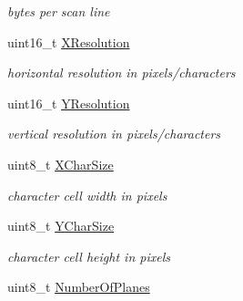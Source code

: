 \begin{DoxyCompactItemize}
\begin{DoxyCompactList}\small\item\em bytes per scan line \end{DoxyCompactList}\item 
uint16\+\_\+t \hyperlink{struct____attribute_____abe48e2b29aa99e813a1447d22711f4f4}{X\+Resolution}\hypertarget{struct____attribute_____abe48e2b29aa99e813a1447d22711f4f4}{}\label{struct____attribute_____abe48e2b29aa99e813a1447d22711f4f4}

\begin{DoxyCompactList}\small\item\em horizontal resolution in pixels/characters \end{DoxyCompactList}\item 
uint16\+\_\+t \hyperlink{struct____attribute_____aa91385451d974d9c33978062e22d39e2}{Y\+Resolution}\hypertarget{struct____attribute_____aa91385451d974d9c33978062e22d39e2}{}\label{struct____attribute_____aa91385451d974d9c33978062e22d39e2}

\begin{DoxyCompactList}\small\item\em vertical resolution in pixels/characters \end{DoxyCompactList}\item 
uint8\+\_\+t \hyperlink{struct____attribute_____acac41a300563737d7849a92cd1d5c10b}{X\+Char\+Size}\hypertarget{struct____attribute_____acac41a300563737d7849a92cd1d5c10b}{}\label{struct____attribute_____acac41a300563737d7849a92cd1d5c10b}

\begin{DoxyCompactList}\small\item\em character cell width in pixels \end{DoxyCompactList}\item 
uint8\+\_\+t \hyperlink{struct____attribute_____acb93d86860efea5c87e3c2950f39123e}{Y\+Char\+Size}\hypertarget{struct____attribute_____acb93d86860efea5c87e3c2950f39123e}{}\label{struct____attribute_____acb93d86860efea5c87e3c2950f39123e}

\begin{DoxyCompactList}\small\item\em character cell height in pixels \end{DoxyCompactList}\item 
uint8\+\_\+t \hyperlink{struct____attribute_____ab1471d2f75e61117d65290da9070cf89}{Number\+Of\+Planes}\hypertarget{struct____attribute_____ab1471d2f75e61117d65290da9070cf89}{}\label{struct____attribute_____ab1471d2f75e61117d65290da9070cf89}


\end{DoxyCompactItemize}
